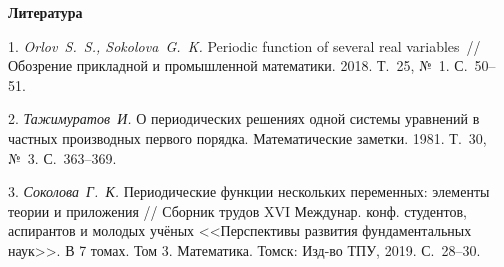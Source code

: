 \smallskip \centerline {\bf Литература} \nopagebreak

1. {\it Orlov~S.~S., Sokolova~G.~K.} Periodic function of several real variables~// Обозрение прикладной и промышленной математики. 2018. Т.~25, №~1. С.~50--51.

2. {\it Тажимуратов~И.} О периодических решениях одной системы уравнений в частных производных первого порядка. Математические заметки. 1981. Т.~30, №~3. С.~363--369.

3. {\it Соколова~Г.~К.} Периодические функции нескольких переменных: элементы теории и приложения // Сборник трудов XVI Междунар. конф. студентов, аспирантов и молодых учёных <<Перспективы развития фундаментальных наук>>. В 7 томах. Том 3. Математика. Томск: Изд-во ТПУ, 2019. С.~28--30.
